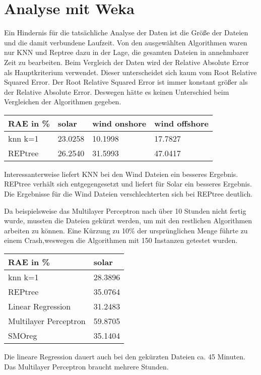 \documentclass[letterpaper]{article} %
\begin{document}
\section*{Analyse mit Weka}
    Ein Hindernis für die tatsächliche Analyse der Daten ist die Größe der Dateien und die damit verbundene Laufzeit. Von den ausgewählten Algorithmen waren nur KNN und Reptree dazu in der Lage, die gesamten Dateien in annehmbarer Zeit zu bearbeiten.
    Beim Vergleich der Daten wird der Relative Absolute Error als Hauptkriterium verwendet. Dieser unterscheidet sich kaum vom Root Relative Squared Error. Der Root Relative Squared Error ist immer konstant größer als der Relative Absolute Error. Deswegen hätte es keinen Unterschied beim Vergleichen der Algorithmen gegeben.
    \hfill\break
    \begin{center}
        \begin{tabular}{|l||l|l|l|}
            \hline
            RAE in \%&solar&wind onshore&wind offshore\\
            \hline
            \hline
            knn k=1&23.0258&10.1998&17.7827\\
            \hline
            REPtree&26.2540&31.5993&47.0417\\
            \hline
        \end{tabular}
    \end{center}
    \hfill\break
    Interessanterweise liefert KNN bei den Wind Dateien ein besseres Ergebnis. REPtree verhält sich entgegengesetzt und liefert für Solar ein besseres Ergebnis. Die Ergebnisse für die Wind Dateien verschlechterten sich bei REPtree deutlich. 

    Da beispielsweise das Multilayer Perceptron nach über 10 Stunden nicht fertig wurde, mussten die Dateien gekürzt werden, um mit den restlichen Algorithmen arbeiten zu können. Eine Kürzung zu 10\% der ursprünglichen Menge führte zu einem Crash,weswegen die Algorithmen mit 150 Instanzen getestet wurden. 
    \hfill\break
    \begin{center}
        \begin{tabular}{|l||l|}
            \hline
            RAE in \%&solar\\
            \hline
            \hline
            knn k=1&28.3896\\
            \hline
            REPtree&35.0764\\
            \hline
            Linear Regression&31.2483\\
            \hline
            Multilayer Perceptron&59.8705\\
            \hline
            SMOreg&35.1404\\
            \hline
        \end{tabular}
    \end{center}
    \hfill\break
    Die lineare Regression dauert auch bei den gekürzten Dateien ca. 45 Minuten. Das Multilayer Perceptron braucht mehrere Stunden.
\end{document}
